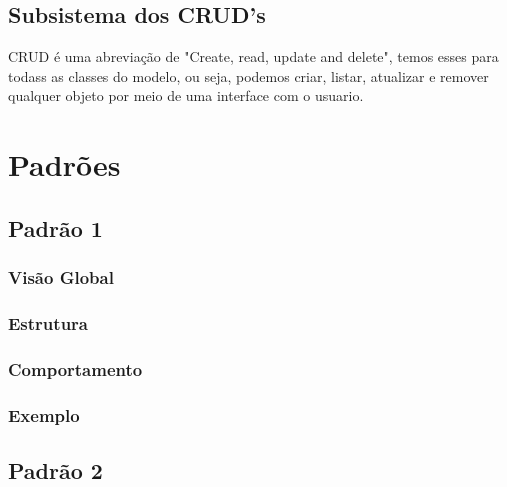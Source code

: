\documentclass[11pt, a4paper]{article}
\begin{document}
            \subsection{Subsistema dos CRUD's}
                CRUD é uma abreviação de "Create, read, update and delete", temos esses para todass as classes do modelo, ou seja, podemos criar, listar, atualizar e remover qualquer objeto por meio de uma interface com o usuario.
            
	\section{Padrões}
        \subsection{Padrão 1}
		
		    \subsubsection{Visão Global}
		
		    \subsubsection{Estrutura}
		
		    \subsubsection{Comportamento}
		
		    \subsubsection{Exemplo}
		        
		\subsection{Padrão 2}
		
\end{document}
